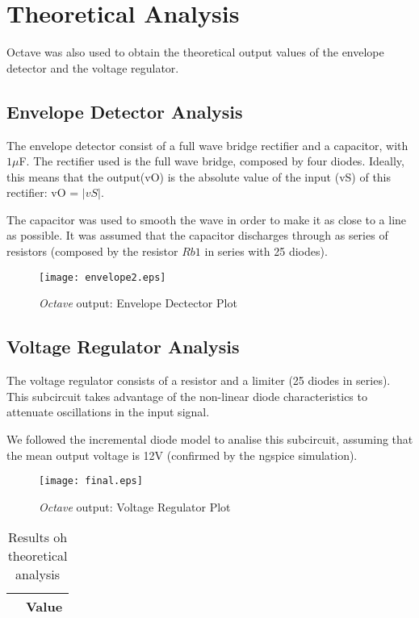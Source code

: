 \section{Theoretical Analysis} \label{sec:analysis}


Octave was also used to obtain the theoretical output values of the envelope detector and the voltage regulator. 



\subsection{Envelope Detector Analysis}

The envelope detector consist of a full wave bridge rectifier and a capacitor, with $1\mu$F.
The rectifier used is the full wave bridge, composed by four diodes. Ideally, this means that the output(vO) is the absolute value of the input (vS) of this rectifier: vO = $|vS|$.

The capacitor was used to smooth the wave in order to make it as close to a line as possible. It was assumed that the capacitor discharges through as series of resistors (composed by the resistor $Rb1$ in series with 25 diodes).



\begin{figure}[h]
    \centering
    \texttt{[image: envelope2.eps]}
    \caption{{\it Octave} output: Envelope Dectector Plot}
    \label{fig:OctaveOut}
\end{figure}



\subsection{Voltage Regulator Analysis}

The voltage regulator consists of a resistor and a limiter (25 diodes in series). This subcircuit takes advantage of the non-linear diode characteristics to attenuate oscillations in the input signal.

We followed the incremental diode model to analise this subcircuit, assuming that the mean output voltage is 12V (confirmed by the ngspice simulation).

\begin{figure}[h]
    \centering
    \texttt{[image: final.eps]}
    \caption{{\it Octave} output: Voltage Regulator Plot}
    \label{fig:OctaveOut}
\end{figure}

\begin{table}[h]
  \centering
  \begin{tabular}{|c|c|}
    \hline    
     & { Value} \\ \hline
    
 \end{tabular}
 \caption{Results oh theoretical analysis}
  \label{tab:op2}
\end{table}
